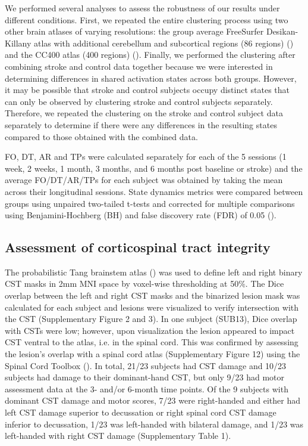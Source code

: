 \documentclass[phd,tocprelim]{cornell}
\begin{document}
	 We performed several analyses to assess the robustness of our results under different conditions. First, we repeated the entire clustering process using two other brain atlases of varying resolutions: the group average FreeSurfer Desikan-Killany atlas with additional cerebellum and subcortical regions (86 regions) (\cite{Desikan2006-vf}) and the CC400 atlas (400 regions) (\cite{Craddock2012-kl}). Finally, we performed the clustering after combining stroke and control data together because we were interested in determining differences in shared activation states across both groups. However, it may be possible that stroke and control subjects occupy distinct states that can only be observed by clustering stroke and control subjects separately. Therefore, we repeated the clustering on the stroke and control subject data separately to determine if there were any differences in the resulting states compared to those obtained with the combined data.

	 


	 FO, DT, AR and TPs were calculated separately for each of the 5 sessions (1 week, 2 weeks, 1 month, 3 months, and 6 months post baseline or stroke) and the average FO/DT/AR/TPs for each subject was obtained by taking the mean across their longitudinal sessions. State dynamics metrics were compared between groups using unpaired two-tailed t-tests and corrected for multiple comparisons using Benjamini-Hochberg (BH) and false discovery rate (FDR) of 0.05 (\cite{Benjamini1995-bb}). 

	 \subsection{Assessment of corticospinal tract integrity}
	 The probabilistic Tang brainstem atlas (\cite{Tang2018-ac}) was used to define left and right binary CST masks in 2mm MNI space by voxel-wise thresholding at 50$\%$. The Dice overlap between the left and right CST masks and the binarized lesion mask was calculated for each subject and lesions were visualized to verify intersection with the CST (Supplementary Figure 2 and 3). In one subject (SUB13), Dice overlap with CSTs were low; however, upon visualization the lesion appeared to impact CST ventral to the atlas, i.e. in the spinal cord. This was confirmed by assessing the lesion's overlap with a spinal cord atlas (Supplementary Figure 12) using the Spinal Cord Toolbox (\cite{De_Leener2017-ev}). In total, 21/23 subjects had CST damage and 10/23 subjects had damage to their dominant-hand CST, but only 9/23 had motor assessment data at the 3- and/or 6-month time points. Of the 9 subjects with dominant CST damage and motor scores, 7/23 were right-handed and either had left CST damage superior to decussation or right spinal cord CST damage inferior to decussation, 1/23 was left-handed with bilateral damage, and 1/23 was left-handed with right CST damage (Supplementary Table 1).
	 
\end{document}
